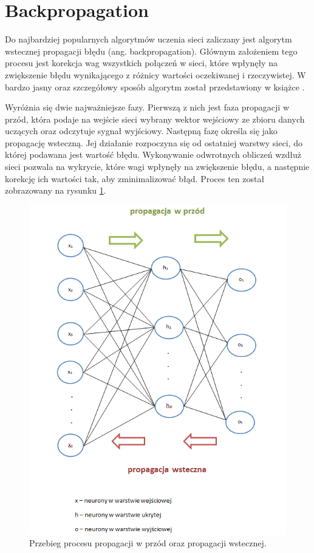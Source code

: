 \section{Backpropagation}

Do najbardziej popularnych algorytmów uczenia sieci zaliczany jest algorytm wstecznej propagacji błędu (ang. backpropagation). Głównym założeniem tego procesu jest korekcja wag wszystkich połączeń w sieci, które wpłynęły na zwiększenie błędu wynikającego z różnicy wartości oczekiwanej i rzeczywistej. W bardzo jasny oraz szczegółowy sposób algorytm został przedstawiony w książce \cite{tade93}.

Wyróżnia się dwie najważniejsze fazy. Pierwszą z nich jest faza propagacji w przód, która podaje na wejście sieci wybrany wektor wejściowy ze zbioru danych uczących oraz odczytuje sygnał wyjściowy. Następną fazę określa się jako propagację wsteczną. Jej działanie rozpoczyna się od ostatniej warstwy sieci, do której podawana jest wartość błędu. Wykonywanie odwrotnych obliczeń wzdłuż sieci pozwala na wykrycie, które wagi wpłynęły na zwiększenie błędu, a następnie korekcję ich wartości tak, aby zminimalizować błąd. Proces ten został zobrazowany na rysunku \ref{fig:back_propagation_flow}.

\begin{figure}[!htbp]
\centering
\includegraphics[width=1\linewidth]{./include/backprop_flow}
\caption{Przebieg procesu propagacji w przód oraz propagacji wstecznej.}
\label{fig:back_propagation_flow}
\end{figure}

